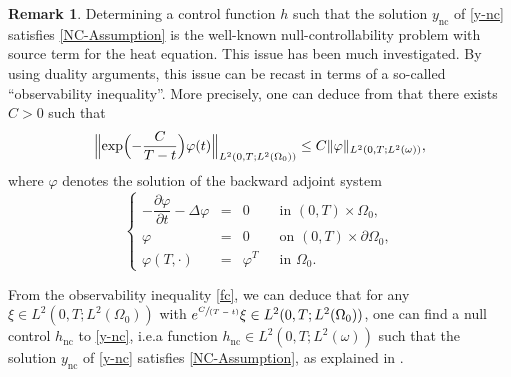 \documentclass[10pt,a4paper]{amsart}
\providecommand{\ie}{i.e.}
\newcommand{\spfrac}[2]{\sfrac{#1}{(#2)}}
\newcommand{\nc}{\mathrm{nc}}
\newcommand{\Bnorm}[1]{\Bigl\Vert#1\Bigr\Vert}
\theoremstyle{definition}
\newtheorem{remark}[theorem]{Remark}
\begin{document}
\begin{remark}
Determining a control function $h$ such that the solution $y_{\nc}$ of \eqref{y-nc} satisfies \eqref{NC-Assumption} is the well-known null-controllability problem with source term for the heat equation. This issue has been much investigated. By using duality arguments, this issue can be recast in terms of a so-called ``observability inequality''. More precisely, one can deduce from \cite[Lem.\,2.1]{FursikovImanuvilov} that there exists $C>0$ such that
\begin{equation}\label{fc}
\Bnorm{\exp\Bigl(- \frac{C}{T-t}\Bigr)\varphi(t)}_ {L^2(0,T; L^2(\Omega_0))} \leq C \| \varphi \|_{L^2(0,T; L^2(\omega))},
\end{equation}
where $\varphi$ denotes the solution of the backward adjoint system
\begin{equation*}
\left\{
\begin{array}{rcll}
-\dfrac{\partial \varphi}{\partial t}-\Delta \varphi &=&0 \quad&\text{ in }(0,T) \times \Omega_0,
\\
\varphi &=& 0 &\text{ on }(0,T) \times \partial \Omega_0,
\\
\varphi\left(T,\cdot\right) &=& \varphi^T &\text{ in }\Omega_0.
\end{array}
\right.
\end{equation*}

From the observability inequality \eqref{fc}, we can deduce that for any $\xi\in L^2(0,T; L^2(\Omega_0))$ with $e^{\spfrac{C}{T-t}}\xi \in L^2(0,T; L^2(\Omega_0))$, one can find a null control $h_{\nc}$ to \eqref{y-nc}, \ie a function $h_{\nc} \in L^2(0,T; L^2(\omega))$ such that the solution $y_{\nc}$ of \eqref{y-nc} satisfies \eqref{NC-Assumption}, as explained in \cite[Proof of Th.\,2.1]{FursikovImanuvilov}.
\end{remark}
\end{document}
